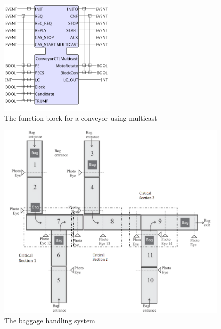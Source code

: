 \documentclass[12pt, conference]{IEEEtran}
\begin{document}
\begin{figure}[htbp]
  \centerline{\includegraphics[width=0.5\textwidth]{function-block.png}}
  \caption{The function block for a conveyor using multicast}
\label{fig:function-block}
\end{figure}

\begin{figure}[htbp]
  \centerline{\includegraphics[width=1.0\textwidth]{baggage-handling-system.png}}
  \caption{The baggage handling system}
\label{fig:baggage-system}
\end{figure}
\end{document}
